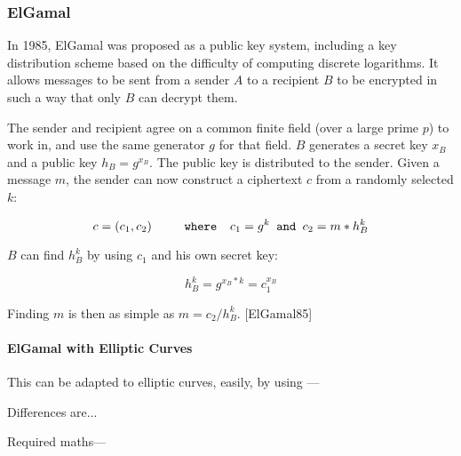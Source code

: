 \subsubsection{ElGamal}

In 1985, ElGamal was proposed as a public key system, including a key distribution scheme based
on the difficulty of computing discrete logarithms. It allows messages to be sent from a sender
\(A\) to a recipient \(B\) to be encrypted in such a way that only \(B\) can decrypt them.

The sender and recipient agree on a common finite field (over a large prime \(p\)) to work in,
and use the same generator \(g\) for that field. \(B\) generates a secret key \(x_B\) and a public
key \(h_B = g^{x_B}\). The public key is distributed to the sender. Given a message \(m\), the
sender can now construct a ciphertext \(c\) from a randomly selected \(k\):

\begin{equation}
	c = (c_1, c_2) \verb+     where  +  c_1 = g^k  \verb+ and +  c_2 = m * h_B^k
\end{equation}

\(B\) can find \(h_B^k\) by using \(c_1\) and his own secret key:

\begin{equation}
	h_B^k = g^{x_B*k} = c_1^{x_B}
\end{equation}

Finding \(m\) is then as simple as \(m = c_2/h_B^k\). [ElGamal85]

\paragraph{ElGamal with Elliptic Curves}
This can be adapted to elliptic curves, easily, by using ---

Differences are...

Required maths---
